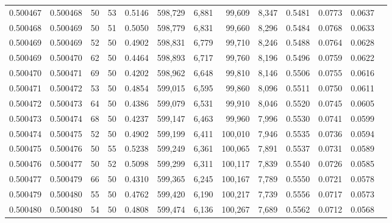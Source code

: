 \begin{tabular}{rrrrrrrrrrrrr}
0.500467 & 0.500468 &    50 &  53 &                                     0.5146 & 598,729 &   6,881 &  99,609 &   8,347 & 0.5481 & 0.0773 & 0.0637 \\
0.500468 & 0.500469 &    50 &  51 &                                     0.5050 & 598,779 &   6,831 &  99,660 &   8,296 & 0.5484 & 0.0768 & 0.0633 \\
0.500469 & 0.500469 &    52 &  50 &                                     0.4902 & 598,831 &   6,779 &  99,710 &   8,246 & 0.5488 & 0.0764 & 0.0628 \\
0.500469 & 0.500470 &    62 &  50 &                                     0.4464 & 598,893 &   6,717 &  99,760 &   8,196 & 0.5496 & 0.0759 & 0.0622 \\
0.500470 & 0.500471 &    69 &  50 &                                     0.4202 & 598,962 &   6,648 &  99,810 &   8,146 & 0.5506 & 0.0755 & 0.0616 \\
0.500471 & 0.500472 &    53 &  50 &                                     0.4854 & 599,015 &   6,595 &  99,860 &   8,096 & 0.5511 & 0.0750 & 0.0611 \\
0.500472 & 0.500473 &    64 &  50 &                                     0.4386 & 599,079 &   6,531 &  99,910 &   8,046 & 0.5520 & 0.0745 & 0.0605 \\
0.500473 & 0.500474 &    68 &  50 &                                     0.4237 & 599,147 &   6,463 &  99,960 &   7,996 & 0.5530 & 0.0741 & 0.0599 \\
0.500474 & 0.500475 &    52 &  50 &                                     0.4902 & 599,199 &   6,411 & 100,010 &   7,946 & 0.5535 & 0.0736 & 0.0594 \\
0.500475 & 0.500476 &    50 &  55 &                                     0.5238 & 599,249 &   6,361 & 100,065 &   7,891 & 0.5537 & 0.0731 & 0.0589 \\
0.500476 & 0.500477 &    50 &  52 &                                     0.5098 & 599,299 &   6,311 & 100,117 &   7,839 & 0.5540 & 0.0726 & 0.0585 \\
0.500477 & 0.500479 &    66 &  50 &                                     0.4310 & 599,365 &   6,245 & 100,167 &   7,789 & 0.5550 & 0.0721 & 0.0578 \\
0.500479 & 0.500480 &    55 &  50 &                                     0.4762 & 599,420 &   6,190 & 100,217 &   7,739 & 0.5556 & 0.0717 & 0.0573 \\
0.500480 & 0.500480 &    54 &  50 &                                     0.4808 & 599,474 &   6,136 & 100,267 &   7,689 & 0.5562 & 0.0712 & 0.0568 \\

\end{tabular}
